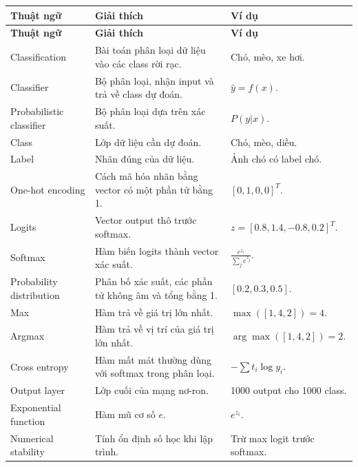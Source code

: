 \documentclass[12pt,a4paper]{report}
\begin{document}
\small
\begin{longtable}{p{}p{}p{}}
\toprule
\textbf{Thuật ngữ} & \textbf{Giải thích} & \textbf{Ví dụ} \\
\midrule
\endfirsthead

\toprule
\textbf{Thuật ngữ} & \textbf{Giải thích} & \textbf{Ví dụ} \\
\midrule
\endhead

Classification & Bài toán phân loại dữ liệu vào các class rời rạc. & Chó, mèo, xe hơi. \\

Classifier & Bộ phân loại, nhận input và trả về class dự đoán. & $\hat{y}=f(x)$. \\

Probabilistic classifier & Bộ phân loại dựa trên xác suất. & $P(y|x)$. \\

Class & Lớp dữ liệu cần dự đoán. & Chó, mèo, diều. \\

Label & Nhãn đúng của dữ liệu. & Ảnh chó có label chó. \\

One-hot encoding & Cách mã hóa nhãn bằng vector có một phần tử bằng 1. & $[0,1,0,0]^T$. \\

Logits & Vector output thô trước softmax. & $z=[0.8,1.4,-0.8,0.2]^T$. \\

Softmax & Hàm biến logits thành vector xác suất. & $\frac{e^{z_i}}{\sum_j e^{z_j}}$. \\

Probability distribution & Phân bố xác suất, các phần tử không âm và tổng bằng 1. & $[0.2,0.3,0.5]$. \\

Max & Hàm trả về giá trị lớn nhất. & $\max([1,4,2])=4$. \\

Argmax & Hàm trả về vị trí của giá trị lớn nhất. & $\arg\max([1,4,2])=2$. \\

Cross entropy & Hàm mất mát thường dùng với softmax trong phân loại. & $-\sum t_i\log y_i$. \\

Output layer & Lớp cuối của mạng nơ-ron. & 1000 output cho 1000 class. \\

Exponential function & Hàm mũ cơ số $e$. & $e^{z_i}$. \\

Numerical stability & Tính ổn định số học khi lập trình. & Trừ max logit trước softmax. \\

\bottomrule
\end{longtable}
\normalsize
\end{document}
